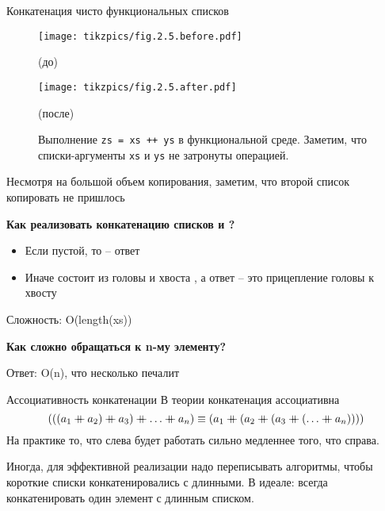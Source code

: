 \begin{frame}{Конкатенация чисто функциональных списков}
\begin{figure}[h]
	\centering
  \texttt{[image: tikzpics/fig.2.5.before.pdf]}\par
	(до)\par
	\vspace{0.5cm}
  \texttt{[image: tikzpics/fig.2.5.after.pdf]}\par
	(после)\par
	\vspace{0.5cm}
	\caption{Выполнение \texttt{zs = xs ++ ys} в функциональной среде. Заметим, что списки-аргументы \texttt{xs} и \texttt{ys} не затронуты операцией.
	}
	\label{fig:2.5}
\end{figure}
Несмотря на большой объем копирования, заметим, что второй список копировать не пришлось
\end{frame}


\begin{frame}{}
\textbf{Как реализовать конкатенацию  \mlinline{++} списков  и ?}
\begin{itemize}
\item Если  пустой, то  -- ответ
\item Иначе  состоит из головы  и хвоста , а ответ -- это прицепление головы  к хвосту  
\end{itemize}
Сложность: O(length(xs))
\vspace{2em}

\textbf{Как сложно обращаться к n-му элементу?}

Ответ: O(n), что несколько печалит

\end{frame}

\begin{frame}{Ассоциативность конкатенации}
В теории конкатенация ассоциативна
\[
  (((a_1 \mdoubleplus a_2) \mdoubleplus a_3) \mdoubleplus\dots \mdoubleplus a_n) \equiv
  (a_1 \mdoubleplus (a_2 \mdoubleplus (a_3 \mdoubleplus (\dots \mdoubleplus a_n))))
\]
На практике то, что слева будет работать сильно медленнее того, что справа.

\begin{hint}
Иногда, для эффективной реализации надо переписывать алгоритмы, чтобы короткие списки конкатенировались с длинными. В идеале: всегда конкатенировать один элемент с длинным списком.
\end{hint}
\end{frame}



